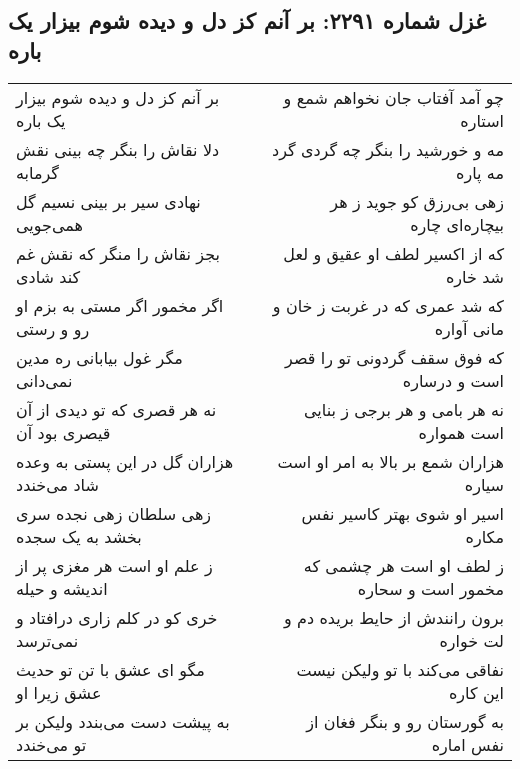 \begin{center}
\section*{غزل شماره ۲۲۹۱: بر آنم کز دل و دیده شوم بیزار یک باره}
\label{sec:2291}
\begin{longtable}{l p{0.5cm} r}
بر آنم کز دل و دیده شوم بیزار یک باره
&&
چو آمد آفتاب جان نخواهم شمع و استاره
\\
دلا نقاش را بنگر چه بینی نقش گرمابه
&&
مه و خورشید را بنگر چه گردی گرد مه پاره
\\
نهادی سیر بر بینی نسیم گل همی‌جویی
&&
زهی بی‌رزق کو جوید ز هر بیچاره‌ای چاره
\\
بجز نقاش را منگر که نقش غم کند شادی
&&
که از اکسیر لطف او عقیق و لعل شد خاره
\\
اگر مخمور اگر مستی به بزم او رو و رستی
&&
که شد عمری که در غربت ز خان و مانی آواره
\\
مگر غول بیابانی ره مدین نمی‌دانی
&&
که فوق سقف گردونی تو را قصر است و درساره
\\
نه هر قصری که تو دیدی از آن قیصری بود آن
&&
نه هر بامی و هر برجی ز بنایی است همواره
\\
هزاران گل در این پستی به وعده شاد می‌خندد
&&
هزاران شمع بر بالا به امر او است سیاره
\\
زهی سلطان زهی نجده سری بخشد به یک سجده
&&
اسیر او شوی بهتر کاسیر نفس مکاره
\\
ز علم او است هر مغزی پر از اندیشه و حیله
&&
ز لطف او است هر چشمی که مخمور است و سحاره
\\
خری کو در کلم زاری درافتاد و نمی‌ترسد
&&
برون رانندش از حایط بریده دم و لت خواره
\\
مگو ای عشق با تن تو حدیث عشق زیرا او
&&
نفاقی می‌کند با تو ولیکن نیست این کاره
\\
به پیشت دست می‌بندد ولیکن بر تو می‌خندد
&&
به گورستان رو و بنگر فغان از نفس اماره
\\
\end{longtable}
\end{center}
